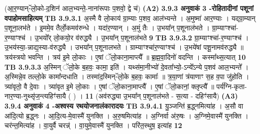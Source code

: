 \documentclass[17pt]{extarticle}
\begin{document}
{{{{{{{{{{{{{{{{{{{{{{                  \newline
                                    (आ॒र॒ण्यान्-ॅलो॒को-द॒शिन॑ आल॒भ्यन्ते॒-नाना॑रूपाः प॒शवो॒ द्वे च॑) \textbf{(A2)} \newline \newline
                \textbf{ 3.9.3     अनुवाकं   3 -रोहितादीनां पशूनां वपाहोमसाहित्यम्} \newline
                                \textbf{ TB 3.9.3.1} \newline
                  अ॒स्मै वै लो॒काय॑ ग्रा॒म्याः प॒शव॒ आल॑भ्यन्ते । अ॒मुष्मा॑ आर॒ण्याः । यद्ग्रा॒म्यान् प॒शूना॒लभ॑ते । इ॒ममे॒व तैर्लो॒कमव॑रुन्धे । यदा॑र॒ण्यान् । अ॒मुं तैः । उ॒भया᳚न् प॒शूनाल॑भते । ग्रा॒म्याꣳश्चा॑-र॒ण्याꣳश्च॑ । उ॒भयो᳚र् लो॒कयो॒र व॑रुद्ध्यै । उ॒भया᳚न् प॒शूनाल॑भते \textbf{ 9} \newline
                  \newline
                                \textbf{ TB 3.9.3.2} \newline
                  ग्रा॒म्याꣳश्चा॑-र॒ण्याꣳश्च॑ । उ॒भय॑स्या॒-न्नाद्य॒स्या-व॑रुद्ध्यै । उभया᳚न् प॒शूनालभते । ग्राम्याꣳश्चा॑र॒ण्याꣳश्च॑ । उ॒भये॑षां पशू॒नामव॑रुद्ध्यै ॥ त्रय॑स्त्रयो भवन्ति । त्रय॑ इ॒मे लो॒काः । ए॒षां ॅलो॒काना॒माप्त्यै᳚ ॥ ब्र॒ह्म॒वा॒दिनो॑ वदन्ति । कस्मा᳚थ्स॒त्यात् \textbf{ 10} \newline
                  \newline
                                \textbf{ TB 3.9.3.3} \newline
                  अ॒स्मिन् ॅलो॒के ब॒हवः॒ कामा॒ इति॑ । यथ्स॑मा॒नीभ्यो॑ दे॒वता᳚भ्यो॒-ऽन्ये᳚ऽन्ये प॒शव॑ आल॒भ्यन्ते᳚ । अ॒स्मिन्ने॒व तल्लो॒के कामा᳚न्दधाति । तस्मा॑द॒स्मिन्-ॅलो॒के ब॒हवः॒ कामाः᳚ ॥ त्र॒या॒णां त्र॑याणाꣳ स॒ह व॒पा जु॑होति । त्र्या॑वृतो॒ वै दे॒वाः । त्र्या॑वृत इ॒मे लो॒काः । ए॒षां ॅलो॒काना॒माप्त्यै᳚ । ए॒षां ॅलो॒कानां॒ क्लृप्त्यै᳚ ॥ पर्य॑ग्नि-कृता-नार॒ण्या-नुथ्सृ॑ज॒न्त्यहिꣳ॑सायै ( ) । \textbf{ 11} \newline
                  \newline
                                    (अव॑रुद्ध्या उ॒भया᳚न् प॒शूनाल॑भते - स॒त्या - दहिꣳ॑सायै) \textbf{(A3)} \newline \newline
                \textbf{ 3.9.4     अनुवाकं   4 -अश्वस्य रथयोजनालंकारादयः} \newline
                                \textbf{ TB 3.9.4.1} \newline
                  यु॒ञ्जन्ति॑ ब्र॒द्ध्नमित्या॑ह । अ॒सौ वा आ॑दि॒त्यो ब्र॒द्ध्नः । आ॒दि॒त्य-मे॒वास्मै॑ युनक्ति । अ॒रु॒षमित्या॑ह । अ॒ग्निर्वा अ॑रु॒षः । अ॒ग्निमे॒वास्मै॑ युनक्ति । चर॑न्त॒मित्या॑ह । वा॒युर्वै चरन्न्॑ । वा॒युमे॒वास्मै॑ युनक्ति । परि॑त॒स्थुष॒ इत्या॑ह \textbf{ 12} \newline
}}}}}}}}}}}}}}}}}}}}}}
\end{document}
